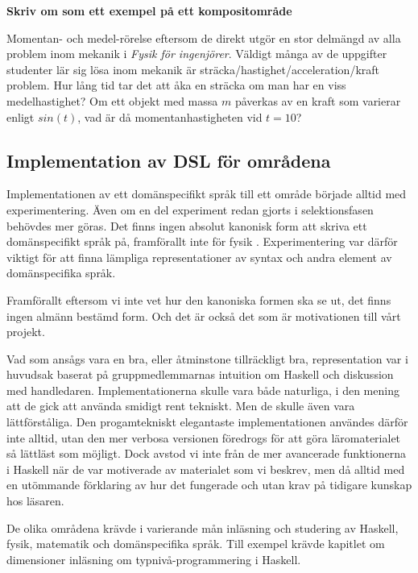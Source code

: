 \begin{binge}
\textbf{Skriv om som ett exempel på ett kompositområde}

Momentan- och medel-rörelse eftersom de direkt utgör en stor delmängd
av alla problem inom mekanik i \textit{Fysik för ingenjörer}. Väldigt många av
de uppgifter studenter lär sig lösa inom mekanik är
sträcka/hastighet/acceleration/kraft problem. Hur lång tid tar det att åka en
sträcka om man har en viss medelhastighet? Om ett objekt med massa $m$
påverkas av en kraft som varierar enligt $sin(t)$, vad är då
momentanhastigheten vid $t=10$?

\subsection{Implementation av DSL för områdena}

Implementationen av ett domänspecifikt språk till ett område började alltid med
experimentering. Även om en del experiment redan gjorts i selektionsfasen
behövdes mer göras. Det finns ingen absolut kanonisk form  att skriva ett domänspecifikt språk på, framförallt inte för
fysik . Experimentering var därför viktigt för att finna
lämpliga representationer av syntax och andra element av domänspecifika språk.


Framförallt eftersom vi inte vet hur den kanoniska formen ska se ut, det finns
ingen almänn bestämd form. Och det är också det som är motivationen till vårt
projekt. 

Vad som ansågs vara en bra, eller åtminstone tillräckligt bra, representation
var i huvudsak baserat på gruppmedlemmarnas intuition om Haskell och diskussion
med handledaren. Implementationerna skulle vara både naturliga, i den mening
att de gick att använda smidigt rent tekniskt. Men de skulle även vara
lättförståliga. Den progamtekniskt elegantaste implementationen användes därför
inte alltid, utan den mer verbosa versionen föredrogs för att göra
läromaterialet så lättläst som möjligt. Dock avstod vi inte från de mer
avancerade funktionerna i Haskell när de var motiverade av materialet som vi
beskrev, men då alltid med en utömmande förklaring av hur det fungerade och utan
krav på tidigare kunskap hos läsaren.

De olika områdena krävde i varierande mån inläsning och studering av Haskell,
fysik, matematik och domänspecifika språk. Till exempel krävde kapitlet om
dimensioner inläsning om typnivå-programmering i Haskell. 


\end{binge}
